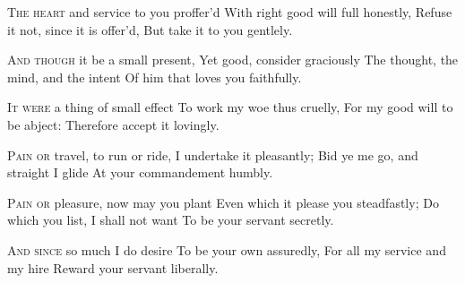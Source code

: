 \documentclass[fontsize=9, a5paper]{scrbook}
\newcommand\blankpage{%
    \null
    \thispagestyle{empty}%
    \addtocounter{page}{-1}%
    \newpage}
\begin{document}
\pagebreak

\afterpage{\blankpage}
\begin{poem}
	\begin{stanza}
		\textsc{The heart} and service to you proffer'd\verseline
		With right good will full honestly,\verseline
		Refuse it not, since it is offer'd,\verseline
		But take it to you gentlely.
	\end{stanza}
	
	\begin{stanza}
		\textsc{And though} it be a small present,\verseline
		Yet good, consider graciously\verseline
		The thought, the mind, and the intent\verseline
		Of him that loves you faithfully.
	\end{stanza}
	
	\begin{stanza}
		\textsc{It were} a thing of small effect\verseline
		To work my woe thus cruelly,\verseline
		For my good will to be abject:\verseline
		Therefore accept it lovingly.
	\end{stanza}
	
	\begin{stanza}
		\textsc{Pain or} travel, to run or ride,\verseline
		I undertake it pleasantly;\verseline
		Bid ye me go, and straight I glide\verseline
		At your commandement humbly.
	\end{stanza}
	
	\begin{stanza}
		\textsc{Pain or} pleasure, now may you plant\verseline
		Even which it please you steadfastly;\verseline
		Do which you list, I shall not want\verseline
		To be your servant secretly.
	\end{stanza}
	
	\begin{stanza}
		\textsc{And since} so much I do desire\verseline
		To be your own assuredly,\verseline
		For all my service and my hire\verseline
		Reward your servant liberally.
	\end{stanza}
\end{poem}

\pagebreak
\end{document}
